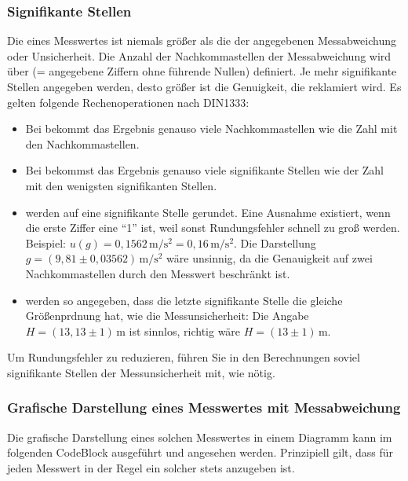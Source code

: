 \documentclass[letterpaper,10pt,english]{jupyterBook}
\begin{document}
\subsubsection{Signifikante Stellen}
\label{\detokenize{content/1_Messunsicherheiten:signifikante-stellen}}
\sphinxAtStartPar
Die  eines Messwertes ist niemals größer als die der angegebenen Messabweichung oder Unsicherheit. Die Anzahl der Nachkommastellen der Messabweichung wird über  (= angegebene Ziffern ohne führende Nullen) definiert. Je mehr signifikante Stellen angegeben werden, desto größer ist die Genuigkeit, die reklamiert wird. Es gelten folgende Rechenoperationen nach DIN1333:
\begin{itemize}
\item {} 
\sphinxAtStartPar
Bei  bekommt das Ergebnis genauso viele Nachkommastellen wie die Zahl mit den  Nachkommastellen.

\item {} 
\sphinxAtStartPar
Bei  bekommst das Ergebnis genauso viele signifikante Stellen wie der Zahl mit den wenigsten signifikanten Stellen.

\item {} 
\sphinxAtStartPar
{} werden auf eine signifikante Stelle gerundet. Eine Ausnahme existiert, wenn die erste Ziffer eine “1” ist, weil sonst Rundungsfehler schnell zu groß werden. Beispiel: \(u(g) = 0,1562\,\mathrm{m/s^2} = 0,16\,\mathrm{m/s^2}\). Die Darstellung \(g = (9,81 \pm 0,03562)\,\mathrm{m/s^2}\) wäre unsinnig, da die Genauigkeit auf zwei Nachkommastellen durch den Messwert beschränkt ist.

\item {} 
\sphinxAtStartPar
{} werden so angegeben, dass die letzte signifikante Stelle die gleiche Größenprdnung hat, wie die Messunsicherheit: Die Angabe \(H=(13,13\pm 1)\,\mathrm m\) ist sinnlos, richtig wäre \(H=(13\pm 1)\,\mathrm m\).

\end{itemize}

\sphinxAtStartPar
Um Rundungsfehler zu reduzieren, führen Sie in den Berechnungen soviel signifikante Stellen der Messunsicherheit mit, wie nötig.


\subsubsection{Grafische Darstellung eines Messwertes mit Messabweichung}
\label{\detokenize{content/1_Messunsicherheiten:grafische-darstellung-eines-messwertes-mit-messabweichung}}
\sphinxAtStartPar
Die grafische Darstellung eines solchen Messwertes in einem Diagramm kann im folgenden Code\sphinxhyphen{}Block ausgeführt und angesehen werden. Prinzipiell gilt, dass für jeden Messwert in der Regel ein solcher  stets anzugeben ist.
\end{document}
